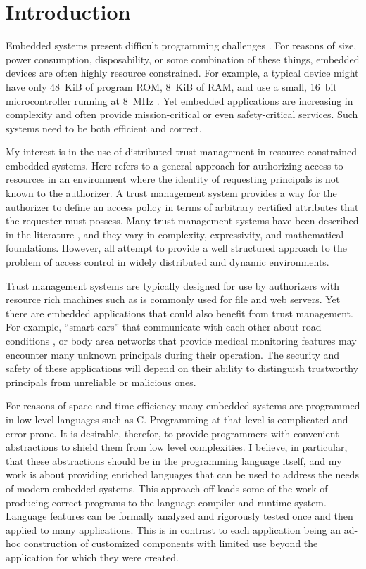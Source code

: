\chapter{Introduction}
\label{chapter-introduction}

Embedded systems present difficult programming challenges
\cite{Mottola:2011:PWS:1922649.1922656}. For reasons of size, power consumption, disposability,
or some combination of these things, embedded devices are often highly resource constrained. For
example, a typical device might have only 48~KiB of program ROM, 8~KiB of RAM, and use a small,
16~bit microcontroller running at 8~MHz \cite{tmotesky-datasheet}. Yet embedded applications are
increasing in complexity and often provide mission-critical or even safety-critical services.
Such systems need to be both efficient and correct.

My interest is in the use of distributed trust management in resource constrained embedded
systems. Here  refers to a general approach for authorizing access to
resources in an environment where the identity of requesting principals is not known to the
authorizer. A trust management system provides a way for the authorizer to define an access
policy in terms of arbitrary certified attributes that the requester must possess. Many trust
management systems have been described in the literature \cite{chapin-skalka-wang-acmcs08}, and
they vary in complexity, expressivity, and mathematical foundations. However, all attempt to
provide a well structured approach to the problem of access control in widely distributed and
dynamic environments.

Trust management systems are typically designed for use by authorizers with resource rich
machines such as is commonly used for file and web servers. Yet there are embedded applications
that could also benefit from trust management. For example, ``smart cars'' that communicate with
each other about road conditions \cite{Seepold:2009:ESP:1641563.1641568}, or body area networks
that provide medical monitoring features
\cite{Shnayder:2005:SNM:1098918.1098979,Chen:2011:BAN:1968858.1968873} may encounter many
unknown principals during their operation. The security and safety of these applications will
depend on their ability to distinguish trustworthy principals from unreliable or malicious ones.

For reasons of space and time efficiency many embedded systems are programmed in low level
languages such as C. Programming at that level is complicated and error prone. It is desirable,
therefor, to provide programmers with convenient abstractions to shield them from low level
complexities. I believe, in particular, that these abstractions should be in the programming
language itself, and my work is about providing enriched languages that can be used to address
the needs of modern embedded systems. This  approach off-loads some of
the work of producing correct programs to the language compiler and runtime system. Language
features can be formally analyzed and rigorously tested once and then applied to many
applications. This is in contrast to each application being an ad-hoc construction of customized
components with limited use beyond the application for which they were created.

